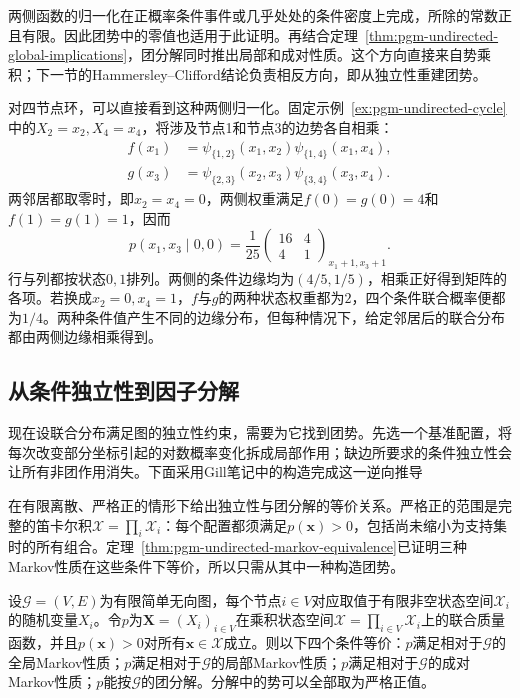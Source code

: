 两侧函数的归一化在正概率条件事件或几乎处处的条件密度上完成，所除的常数正且有限。因此团势中的零值也适用于此证明。再结合定理~\ref{thm:pgm-undirected-global-implications}，团分解同时推出局部和成对性质。这个方向直接来自势乘积；下一节的Hammersley--Clifford结论负责相反方向，即从独立性重建团势。

对四节点环，可以直接看到这种两侧归一化。固定示例~\ref{ex:pgm-undirected-cycle}中的$X_2=x_2,X_4=x_4$，将涉及节点1和节点3的边势各自相乘：
\[
  \begin{aligned}
    f(x_1)&=\psi_{\{1,2\}}(x_1,x_2)\psi_{\{1,4\}}(x_1,x_4),\\
    g(x_3)&=\psi_{\{2,3\}}(x_2,x_3)\psi_{\{3,4\}}(x_3,x_4).
  \end{aligned}
\]
两邻居都取零时，即$x_2=x_4=0$，两侧权重满足$f(0)=g(0)=4$和$f(1)=g(1)=1$，因而
\[
  p(x_1,x_3\mid0,0)
  =\frac{1}{25}
    \begin{pmatrix}16&4\\4&1\end{pmatrix}_{x_1+1,x_3+1}.
\]
行与列都按状态$0,1$排列。两侧的条件边缘均为$(4/5,1/5)$，相乘正好得到矩阵的各项。若换成$x_2=0,x_4=1$，$f$与$g$的两种状态权重都为$2$，四个条件联合概率便都为$1/4$。两种条件值产生不同的边缘分布，但每种情况下，给定邻居后的联合分布都由两侧边缘相乘得到。

\subsection{从条件独立性到因子分解}
\label{sec:pgm-undirected-hammersley-clifford}

现在设联合分布满足图的独立性约束，需要为它找到团势。先选一个基准配置，将每次改变部分坐标引起的对数概率变化拆成局部作用；缺边所要求的条件独立性会让所有非团作用消失。下面采用Gill笔记中的构造完成这一逆向推导

在有限离散、严格正的情形下给出独立性与团分解的等价关系。严格正的范围是完整的笛卡尔积$\mathcal{X}=\prod_i\mathcal{X}_i$：每个配置都须满足$p(\bm{x})>0$，包括尚未缩小为支持集时的所有组合。定理~\ref{thm:pgm-undirected-markov-equivalence}已证明三种Markov性质在这些条件下等价，所以只需从其中一种构造团势。

\begin{theorem}
  \label{thm:pgm-undirected-hammersley-clifford}
  设$\mathcal{G}=(V,E)$为有限简单无向图，每个节点$i\in V$对应取值于有限非空状态空间$\mathcal{X}_i$的随机变量$X_i$。令$p$为$\bm{X}=(X_i)_{i\in V}$在乘积状态空间$\mathcal{X}=\prod_{i\in V}\mathcal{X}_i$上的联合质量函数，并且$p(\bm{x})>0$对所有$\bm{x}\in\mathcal{X}$成立。则以下四个条件等价：$p$满足相对于$\mathcal{G}$的全局Markov性质；$p$满足相对于$\mathcal{G}$的局部Markov性质；$p$满足相对于$\mathcal{G}$的成对Markov性质；$p$能按$\mathcal{G}$的团分解。分解中的势可以全部取为严格正值。
\end{theorem}

